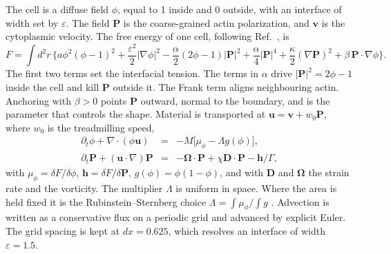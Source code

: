 \documentclass[11pt]{article}
\begin{document}
\noindent
The cell is a diffuse field $\phi$, equal to 1 inside and 0 outside, with an interface of width set by $\varepsilon$. The field $\mathbf{P}$ is the coarse-grained actin polarization, and $\mathbf{v}$ is the cytoplasmic velocity. The free energy of one cell, following Ref.~\cite{Tjhung:2015}, is
\begin{equation}\label{eq:free}
F=\int d^{2}r\,\Big\{a\phi^{2}(\phi-1)^{2}+\frac{\varepsilon^{2}}{2}|\nabla\phi|^{2}
-\frac{\alpha}{2}(2\phi-1)|\mathbf{P}|^{2}
+\frac{\alpha}{4}|\mathbf{P}|^{4}+\frac{\kappa}{2}(\nabla\mathbf{P})^{2}
+\beta\,\mathbf{P}\cdot\nabla\phi\Big\}.
\end{equation}
The first two terms set the interfacial tension. The terms in $\alpha$ drive $|\mathbf{P}|^{2}=2\phi-1$ inside the cell and kill $\mathbf{P}$ outside it. The Frank term aligns neighbouring actin. Anchoring with $\beta>0$ points $\mathbf{P}$ outward, normal to the boundary, and is the parameter that controls the shape. Material is transported at $\mathbf{u}=\mathbf{v}+w_{0}\mathbf{P}$, where $w_{0}$ is the treadmilling speed,
\begin{eqnarray}\label{eq:evol}
\partial_{t}\phi+\nabla\cdot(\phi\mathbf{u})&=&-M\big[\mu_{\phi}-\Lambda g(\phi)\big],\nonumber\\
\partial_{t}\mathbf{P}+(\mathbf{u}\cdot\nabla)\mathbf{P}&=&-\boldsymbol{\Omega}\cdot\mathbf{P}+\chi\mathbf{D}\cdot\mathbf{P}-\mathbf{h}/\Gamma,
\end{eqnarray}
with $\mu_{\phi}=\delta F/\delta\phi$, $\mathbf{h}=\delta F/\delta\mathbf{P}$, $g(\phi)=\phi(1-\phi)$, and with $\mathbf{D}$ and $\boldsymbol{\Omega}$ the strain rate and the vorticity. The multiplier $\Lambda$ is uniform in space. Where the area is held fixed it is the Rubinstein--Sternberg choice $\Lambda=\int\mu_{\phi}/\int g$ \cite{Rubinstein:1992}. Advection is written as a conservative flux on a periodic grid and advanced by explicit Euler. The grid spacing is kept at $dx=0.625$, which resolves an interface of width $\varepsilon=1.5$.
\end{document}
